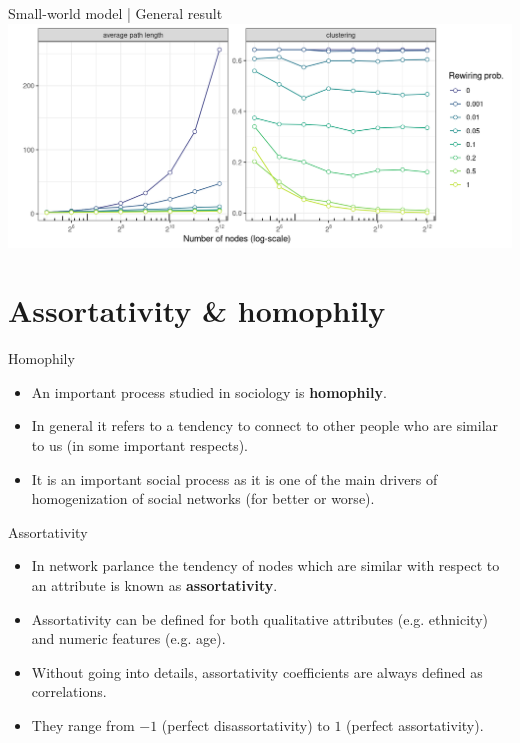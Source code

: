 \documentclass[
    hyperref={colorlinks,linkcolor=blue,urlcolor=blue,citecolor=blue}
]{beamer}
\begin{document}
\begin{frame}{Small-world model | General result}
\centering
\includegraphics[width=\textwidth]{structure/small_world_simulation_plot-1}
\end{frame}

\section{Assortativity \& homophily}

\begin{frame}{Homophily}
\begin{itemize}
    \item<1-> An important process studied in sociology is \textbf{homophily}.
    \item<2-> In general it refers to a tendency to connect to other people
    who are similar to us (in some important respects).
    \item<3-> It is an important social process as it is one of the main
    drivers of homogenization of social networks (for better or worse).
\end{itemize}
\end{frame}

\begin{frame}{Assortativity}
\begin{itemize}
    \item<2-> In network parlance the tendency of nodes which are similar
    with respect to an attribute is known as \textbf{assortativity}.
    \item<3-> Assortativity can be defined for both qualitative attributes
    (e.g. ethnicity) and numeric features (e.g. age).
    \item<4-> Without going into details, assortativity coefficients are always
    defined as correlations.
    \item<5-> They range from $-1$ (perfect disassortativity) to $1$
    (perfect assortativity).
\end{itemize}
\end{frame}
\end{document}
